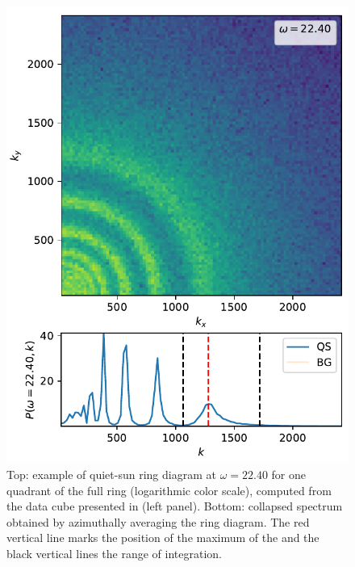 \documentclass{aa}
\begin{document}
\begin{figure}\centering
	\includegraphics[width=1.0\linewidth]{ring_diagram_spectrum}
	\caption{Top: example of quiet-sun ring diagram at $\omega=22.40$ 
	for one quadrant of the full ring (logarithmic color scale), computed from the data cube presented in  (left panel). 
	Bottom: collapsed spectrum obtained by azimuthally averaging the ring diagram. The red vertical line marks the position of the maximum of the \fff and the black vertical lines the range of integration.
	}
	\label{ring_diagram}
\end{figure}
\end{document}
